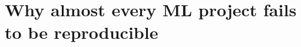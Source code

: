 \chapter{Why almost every ML project fails to be reproducible}
\label{ch:why-almost-every-ml-project-fails-to-be}

